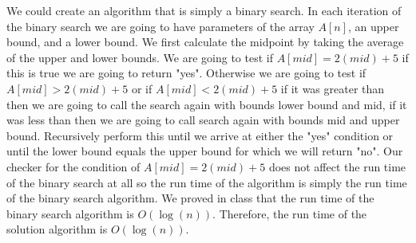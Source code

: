 \documentclass{article}
\begin{document}
We could create an algorithm that is simply a binary search. In each iteration of the binary search we are going to have parameters of the array $A[n]$, an upper bound, and a lower bound. We first calculate the midpoint by taking the average of the upper and lower bounds. We are going to test if $A[mid] = 2(mid)+5$ if this is true we are going to return "yes". Otherwise we are going to test if $A[mid] > 2(mid)+5$ or if $A[mid] < 2(mid)+5$ if it was greater than then we are going to call the search again with bounds lower bound and mid, if it was less than then we are going to call search again with bounds mid and upper bound. Recursively perform this until we arrive at either the "yes" condition or until the lower bound equals the upper bound for which we will return "no". Our checker for the condition of $A[mid] = 2(mid) + 5$ does not affect the run time of the binary search at all so the run time of the algorithm is simply the run time of the binary search algorithm. We proved in class that the run time of the binary search algorithm is $O(\log(n))$. Therefore, the run time of the solution algorithm is $O(\log(n)).$

\clearpage
\end{document}
